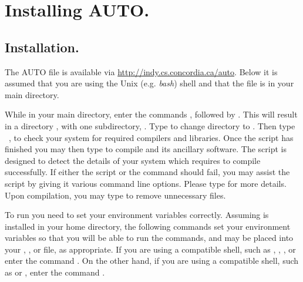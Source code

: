 \documentclass[12pt]{report}
\begin{document}
\chapter{Installing {\cal AUTO}.} \label{ch:Installing_AUTO}
\section{ Installation.} \label{sec:Installation}
The {\cal AUTO} file  is
available via \url{http://indy.cs.concordia.ca/auto}.
Below it is assumed that you are using the Unix (e.g. \emph{bash}) shell 
and that the file  is in your main directory.

While in your main directory, enter the commands
,
followed by .
This will result in a directory , 
with one subdirectory, . 
Type 
to change directory to .
Then type
~,
to check your system for required compilers and libraries.
Once the  script has finished you 
may then type  to compile \AUTO
and its ancillary software.
The  script is designed to detect the details
of your system which \AUTO requires to compile successfully.
If either the  script or the  command
should fail, you may assist the  script by giving
it various command line options.  Please type 
for more details.
Upon compilation, you may type 
to remove unnecessary files.

To run \AUTO you need to set your environment variables correctly.
Assuming \AUTO is installed in your home directory, the following
commands set your environment variables so that you will be able to
run the \AUTO commands, and may be placed into your ,
, or  file, as appropriate.  If you are
using a  compatible shell, such as ,
, , or  enter the command
.  On the
other hand, if you are using a  compatible shell, such
as  or , enter the command .
\end{document}
